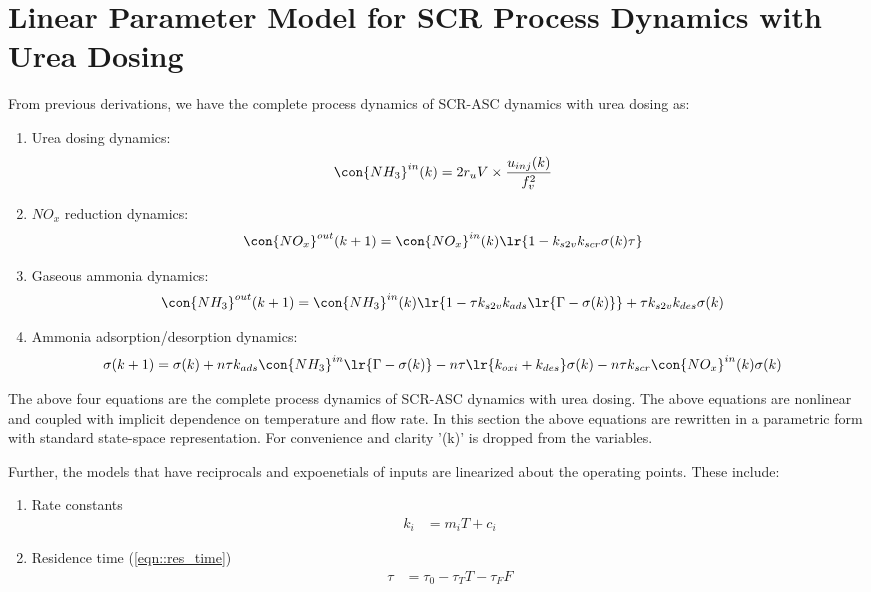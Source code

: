 \newpage
\section{Linear Parameter Model for SCR Process Dynamics with Urea Dosing \label{sec::proc_dyn}}
From previous derivations, we have the complete process dynamics of SCR-ASC dynamics with urea dosing as:

\begin{enumerate}
    \item Urea dosing dynamics:
    \begin{align*}
    \con{NH_3}^{in} (k) &= 2r_u V \times \frac{u_{inj}(k)}{f_v^2}
    \end{align*}

    \item $NO_x$ reduction dynamics:
    \begin{align*}
    \con{NO_x}^{out} (k + 1) &= \con{NO_x}^{in} (k) \lr{1 - k_{s2v} k_{scr} \sigma(k) \tau}
    \end{align*}

    \item Gaseous ammonia dynamics:
    \begin{align*}
    \con{NH_3}^{out} (k + 1) &= \con{NH_3}^{in}(k) \lr{1 - \tau k_{s2v}k_{ads} \lr{\Gamma - \sigma(k)}} + \tau k_{s2v} k_{des} \sigma(k)
    \end{align*}

    \item Ammonia adsorption/desorption dynamics:
 \begin{align*}
        \sigma(k + 1) &= \sigma(k)
        + n\tau k_{ads} \con{NH_3}^{in} \lr{\Gamma - \sigma(k)}
        - n \tau \lr{k_{oxi} + k_{des}} \sigma(k)
        - n \tau k_{scr} \con{NO_x}^{in}(k) \sigma(k)
    \end{align*}
\end{enumerate}

The above four equations are the complete process dynamics of SCR-ASC dynamics with urea dosing. The above equations are
nonlinear and coupled with implicit dependence on temperature and flow rate. In this section the above equations are
rewritten in a parametric form with standard state-space representation. For convenience and clarity '(k)' is dropped
from the variables.


Further, the models that have reciprocals and expoenetials of inputs are linearized about the operating points. These include:
\begin{enumerate}
    \item Rate constants
        \begin{align}
            k_i &= m_i T + c_i
        \end{align}
    \item Residence time (\ref{eqn::res_time})
        \begin{align}
            \tau &= \tau_0 - \tau_T T - \tau_F F
        \end{align}
\end{enumerate}

